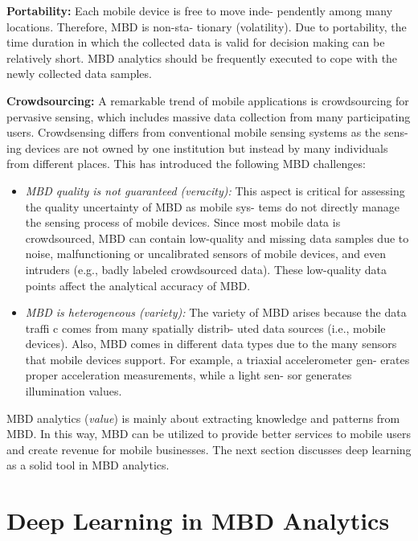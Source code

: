 \documentclass[14pt, a4paper]{extarticle}
\begin{document}
\textbf{Portability:} Each mobile device is free to move inde-
pendently among many locations. Therefore, MBD is non-sta-
tionary (volatility). Due to portability, the time duration in
which the collected data is valid for decision making can be
relatively short. MBD analytics should be frequently executed
to cope with the newly collected data samples.

\textbf{Crowdsourcing:} A remarkable trend of mobile applications
is crowdsourcing for pervasive sensing, which includes massive
data collection from many participating users. Crowdsensing
differs from conventional mobile sensing systems as the sens-
ing devices are not owned by one institution but instead by
many individuals from different places. This has introduced
the following MBD challenges:

\begin{itemize}
\item {\textit{MBD quality is not guaranteed (veracity):} This aspect is critical
for assessing the quality uncertainty of MBD as mobile sys-
tems do not directly manage the sensing process of mobile
devices. Since most mobile data is crowdsourced, MBD can
contain low-quality and missing data samples due to noise,
malfunctioning or uncalibrated sensors of mobile devices,
and even intruders (e.g., badly labeled crowdsourced data).
These low-quality data points affect the analytical accuracy
of MBD.}

\item{\textit{MBD is heterogeneous (variety):} The variety of MBD arises
because the data traffi c comes from many spatially distrib-
uted data sources (i.e., mobile devices). Also, MBD comes
in different data types due to the many sensors that mobile
devices support. For example, a triaxial accelerometer gen-
erates proper acceleration measurements, while a light sen-
sor generates illumination values.}

\end{itemize}

MBD analytics (\textit{value}) is mainly about extracting knowledge
and patterns from MBD. In this way, MBD can be utilized to
provide better services to mobile users and create revenue for
mobile businesses. The next section discusses deep learning as
a solid tool in MBD analytics.

\section{Deep Learning in MBD Analytics}
\end{document}
